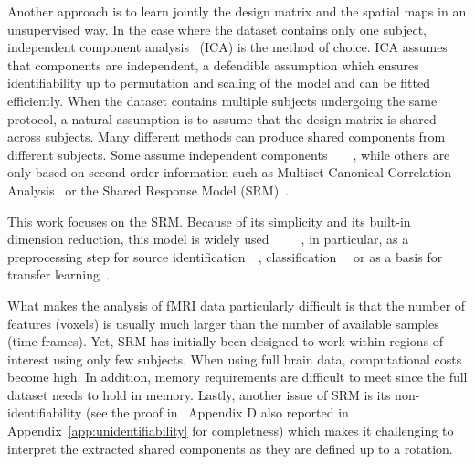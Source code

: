 \documentclass{article}
\begin{document}
Another approach is to learn jointly the design matrix and the spatial maps in
an unsupervised way.
%
In the case where the dataset contains only one subject,
independent component analysis~\cite{jutten1991blind} (ICA) is the method of choice.
%
ICA assumes that components are independent, a defendible assumption
which ensures identifiability up to permutation and scaling of the
model and can be fitted efficiently.
%
When the dataset contains multiple subjects undergoing the same
protocol, a natural assumption is to assume that the design matrix is
shared across subjects.
%
Many different methods can produce shared components from different
subjects.
%
Some assume independent
components~\cite{richard2021model}~\cite{richard2020modeling}~\cite{varoquaux2009canica}~\cite{calhoun2001method},
while others are only based on second order information such as
Multiset Canonical Correlation Analysis~\cite{via2011joint} or the
Shared Response Model (SRM)~\cite{chen2015reduced}.
%

This work focuses on the SRM. Because of its simplicity and its
built-in dimension reduction, this model is widely
used~\cite{baldassano2017discovering}~\cite{cohen2017computational}~\cite{baldassano2018representation}~\cite{jolly2020custom}~\cite{lee2021anticipation},
in particular, as a preprocessing step for source
identification~\cite{richard2021model}~\cite{richard2020modeling},
classification~\cite{turek2018capturing}~\cite{chen2017shared}\cite{zhang2016searchlight}
or as a basis for transfer learning~\cite{zhang2018transfer}.


What makes the analysis of fMRI data particularly difficult is that
the number of features (voxels) is usually much
larger than the number of available samples (time frames).
Yet, SRM has initially been designed to work within regions of interest using
only few subjects.
%
When using full brain data, computational costs become
high.
%
In addition, memory requirements are difficult to meet since the full dataset
needs to hold in memory.
%
Lastly, another issue of SRM is its non-identifiability (see the proof
in~\cite{richard2020modeling} Appendix D also reported in Appendix~\ref{app:unidentifiability} for completness) which makes it challenging to
interpret the extracted shared components as they are defined up to a rotation.
%
\end{document}
